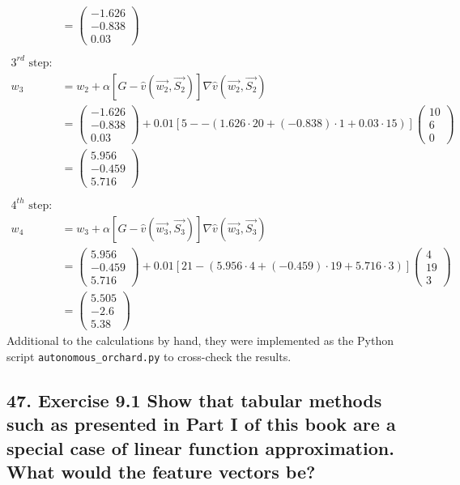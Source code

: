 \documentclass[10pt,a4paper]{article}
\begin{document}
\begin{align*}
&= \begin{pmatrix} -1.626 \\ -0.838 \\ 0.03\end{pmatrix} \\ \\
\text{$3^{rd}$ step:}\\
w_3 &= w_2 + \alpha [G - \hat{v}(\vec{w_2}, \vec{S_2})]\nabla \hat{v}(\vec{w_2}, \vec{S_2}) \\
&= \begin{pmatrix} -1.626 \\ -0.838 \\ 0.03\end{pmatrix} + 0.01 [5 - -(1.626\cdot 20 + (-0.838) \cdot 1 + 0.03 \cdot 15)]\begin{pmatrix} 10 \\ 6 \\ 0\end{pmatrix} \\
&= \begin{pmatrix} 5.956 \\ -0.459 \\ 5.716\end{pmatrix} \\ \\
\text{$4^{th}$ step:}\\
w_4 &= w_3 + \alpha [G - \hat{v}(\vec{w_3}, \vec{S_3})]\nabla \hat{v}(\vec{w_3}, \vec{S_3}) \\
&= \begin{pmatrix} 5.956 \\ -0.459 \\ 5.716\end{pmatrix} + 0.01 [21 - (5.956\cdot 4 + (-0.459) \cdot 19 + 5.716 \cdot 3)]\begin{pmatrix} 4 \\ 19 \\ 3\end{pmatrix} \\
&= \begin{pmatrix} 5.505 \\ -2.6 \\ 5.38\end{pmatrix}
\end{align*}
Additional to the calculations by hand, they were implemented as the Python script \texttt{autonomous\_orchard.py} to cross-check the results.

\newpage
\subsection*{47. Exercise 9.1 Show that tabular methods such as presented in Part I of this book are a special case of linear function approximation. What would the feature vectors be?}
\end{document}
